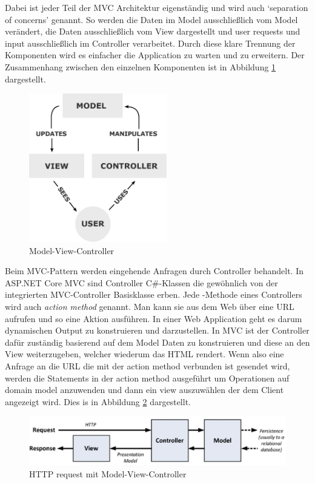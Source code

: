 Dabei ist jeder Teil der MVC Architektur eigenständig und wird auch `separation of concerns' genannt. So werden die Daten im Model ausschließlich vom Model verändert, die Daten ausschließlich vom View dargestellt und user requests und input ausschließlich im Controller verarbeitet. Durch diese klare Trennung der Komponenten wird es einfacher die Application zu warten und zu erweitern. Der Zusammenhang zwischen den einzelnen Komponenten ist in Abbildung \ref{fig:mvc} dargestellt.

\begin{figure}
\centering
\includegraphics[width=6cm]{Figures/mvc}
\caption{Model-View-Controller}
\label{fig:mvc}
\end{figure}

 Beim MVC-Pattern werden eingehende Anfragen durch Controller behandelt. In ASP.NET Core MVC sind Controller C\#-Klassen die gewöhnlich von der integrierten MVC-Controller Basisklasse  erben. Jede -Methode eines Controllers wird auch \emph{action method} genannt. Man kann sie aus dem Web über eine URL aufrufen und so eine Aktion ausführen. In einer Web Application geht es darum dynamischen Output zu konstruieren und darzustellen. In MVC ist der Controller dafür zuständig basierend auf dem Model Daten zu konstruieren und diese an den View weiterzugeben, welcher wiederum das HTML rendert. Wenn also eine Anfrage an die URL die mit der action method verbunden ist gesendet wird, werden die Statements in der action method ausgeführt um Operationen auf domain model anzuwenden und dann ein view auszuwählen der dem Client angezeigt wird. Dies is in Abbildung \ref{fig:mvc_http} dargestellt.
 
 
 \begin{figure}
\centering
\includegraphics[width=\textwidth]{Figures/mvc_http}
\caption{HTTP request mit Model-View-Controller}
\label{fig:mvc_http}
\end{figure}
 
